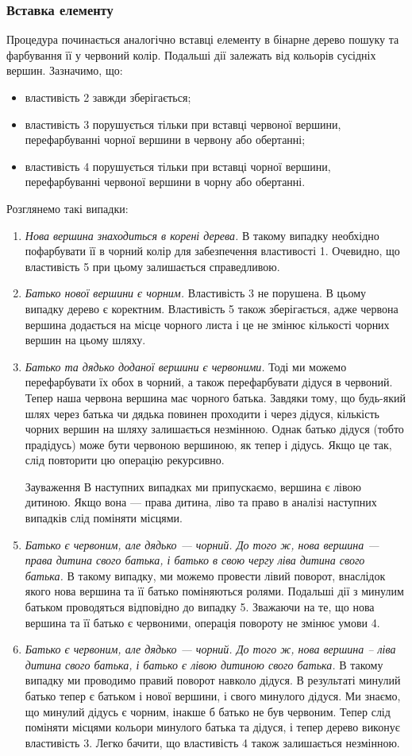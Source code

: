 \documentclass[a4paper,10pt,notitlepage,pdftex,headsepline]{scrartcl}
\begin{document}
\subsubsection{Вставка елементу}
Процедура починається аналогічно вставці елементу в бінарне дерево пошуку та фарбування її у червоний колір.
Подальші дії залежать від кольорів сусідніх вершин.
Зазначимо, що:
\begin{itemize}
\item властивість 2 завжди зберігається;
\item властивість 3 порушується тільки при вставці червоної вершини, перефарбуванні чорної вершини в червону або обертанні;
\item властивість 4 порушується тільки при вставці чорної вершини, перефарбуванні червоної вершини в чорну або обертанні.
\end{itemize}

Розглянемо такі випадки:
\begin{enumerate}
\item \textit{Нова вершина знаходиться в корені дерева.}
В такому випадку необхідно пофарбувати її в чорний колір для забезпечення властивості 1.
Очевидно, що властивість 5 при цьому залишається справедливою.
\item \textit{Батько нової вершини є чорним.}
Властивість 3 не порушена.
В цьому випадку дерево є коректним.
Властивість 5 також зберігається, адже червона вершина додається на місце чорного листа і це не змінює кількості чорних вершин на цьому шляху.
\item \textit{Батько та дядько доданої вершини є червоними.}
Тоді ми можемо перефарбувати їх обох в чорний, а також перефарбувати дідуся в червоний.
Тепер наша червона вершина має чорного батька.
Завдяки тому, що будь-який шлях через батька чи дядька повинен проходити і через дідуся, кількість чорних вершин на шляху залишається незмінною.
Однак батько дідуся (тобто прадідусь) може бути червоною вершиною, як тепер і дідусь.
Якщо це так, слід повторити цю операцію рекурсивно.
\item[Зауваження] В наступних випадках ми припускаємо, вершина є лівою дитиною. Якщо вона --- права дитина, ліво та право в аналізі наступних випадків слід поміняти місцями.
\item \textit{Батько є червоним, але дядько --- чорний.
До того ж, нова вершина --- права дитина свого батька, і батько в свою чергу ліва дитина свого батька.}
В такому випадку, ми можемо провести лівий поворот, внаслідок якого нова вершина та її батько поміняються ролями.
Подальші дії з минулим батьком проводяться відповідно до випадку 5.
Зважаючи на те, що нова вершина та її батько є червоними, операція повороту не змінює умови 4.
\item \textit{Батько є червоним, але дядько --- чорний.
До того ж, нова вершина -- ліва дитина свого батька, і батько є лівою дитиною свого батька.}
В такому випадку ми проводимо правий поворот навколо дідуся.
В результаті минулий батько тепер є батьком і нової вершини, і свого минулого дідуся.
Ми знаємо, що минулий дідусь є чорним, інакше б батько не був червоним.
Тепер слід поміняти місцями кольори минулого батька та дідуся, і тепер дерево виконує властивість 3.
Легко бачити, що властивість 4 також залишається незмінною.
\end{enumerate}
\end{document}
